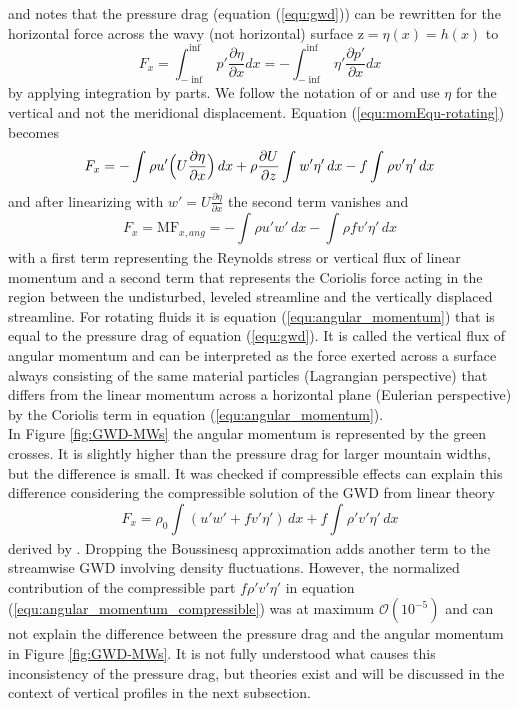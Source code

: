 and notes that the pressure drag (equation (\ref{equ:gwd})) can be rewritten for the horizontal force across the wavy (not horizontal) surface z$= \eta(x)=h(x)$ to
\begin{equation}
    F_x =  \int_{-\inf}^{\inf} p' \frac{\partial \eta}{\partial x} dx = -\int_{-\inf}^{\inf} \eta' \frac{\partial p'}{\partial x} dx
    \label{equ:pdrag-rotating}
\end{equation}
by applying integration by parts. We follow the notation of \textcite[]{smith_influence_1979} or \textcite{broad_linear_1995} and use $\eta$ for the vertical and not the meridional displacement. Equation (\ref{equ:momEqu-rotating}) becomes 
\begin{equation}
    F_x =  -\int_{}^{} \rho u' \Bigl(U \frac{\partial \eta}{\partial x}\Bigr) \, dx + \rho \frac{\partial U}{\partial z} \int_{}^{} w' \eta' \, dx  - f \int_{}^{} \rho v' \eta' \, dx 
    \label{equ:momEqu-rotating-2}
\end{equation}
and after linearizing with $w'=U\frac{\partial \eta}{\partial x}$ the second term vanishes and
\begin{equation}
    F_x = \mathrm{MF}_{x,ang} = -\int_{}^{} \rho u'w' \, dx  -  \int_{}^{} \rho f v' \eta' \, dx
    \label{equ:angular_momentum}
\end{equation}
with a first term representing the Reynolds stress or vertical flux of linear momentum and a second term that represents the Coriolis force acting in the region between the undisturbed, leveled streamline and the vertically displaced streamline. For rotating fluids it is equation (\ref{equ:angular_momentum}) that is equal to the pressure drag of equation (\ref{equ:gwd}). It is called the vertical flux of angular momentum and can be interpreted as the force exerted across a surface always consisting of the same material particles (Lagrangian perspective) that differs from the linear momentum across a horizontal plane (Eulerian perspective) by the Coriolis term in equation (\ref{equ:angular_momentum}). \\
In Figure \ref{fig:GWD-MWs} the angular momentum is represented by the green crosses. It is slightly higher than the pressure drag for larger mountain widths, but the difference is small. It was checked if compressible effects can explain this difference considering the compressible solution of the GWD from linear theory 
\begin{equation}
    F_x =  \rho_0 \int_{}^{} (u'w' + f v' \eta') \, dx + f \int_{}^{} \rho' v' \eta' \, dx
    \label{equ:angular_momentum_compressible}
\end{equation}
derived by \textcite[]{broad_linear_1995}. Dropping the Boussinesq approximation adds another term to the streamwise GWD involving density fluctuations. However, the normalized contribution of the compressible part $f \rho' v' \eta'$ in equation (\ref{equ:angular_momentum_compressible}) was at maximum $\mathcal{O}(10^{-5})$ and can not explain the difference between the pressure drag and the angular momentum in Figure \ref{fig:GWD-MWs}. It is not fully understood what causes this inconsistency of the pressure drag, but theories exist and will be discussed in the context of vertical profiles in the next subsection. 

